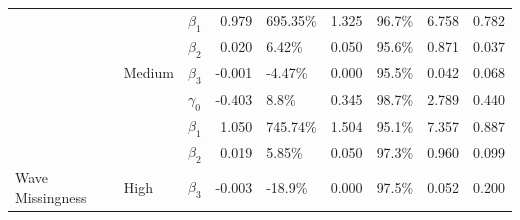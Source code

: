 \documentclass{svjour3}\usepackage[]{graphicx}\usepackage[]{color}
\newenvironment{knitrout}{}{} %
\begin{document}
\begin{knitrout}
\begin{table}[!h]
{\begin{tabular}[t]{l|l|l|r|l|r|l|r|r}
 &  & $\beta_1$ & 0.979 & 695.35\% & 1.325 & 96.7\% & 6.758 & 0.782\\

 &  & $\beta_2$ & 0.020 & 6.42\% & 0.050 & 95.6\% & 0.871 & 0.037\\

 & \multirow{-4}{*}{\raggedright\arraybackslash Medium} & $\beta_3$ & -0.001 & -4.47\% & 0.000 & 95.5\% & 0.042 & 0.068\\

 &  & $\gamma_0$ & -0.403 & 8.8\% & 0.345 & 98.7\% & 2.789 & 0.440\\

 &  & $\beta_1$ & 1.050 & 745.74\% & 1.504 & 95.1\% & 7.357 & 0.887\\

 &  & $\beta_2$ & 0.019 & 5.85\% & 0.050 & 97.3\% & 0.960 & 0.099\\

\multirow{-12}{*}{\raggedright\arraybackslash Wave Missingness} & \multirow{-4}{*}{\raggedright\arraybackslash High} & $\beta_3$ & -0.003 & -18.9\% & 0.000 & 97.5\% & 0.052 & 0.200\\
\hline
\end{tabular}}
\end{table}


\end{knitrout}


\end{document}
